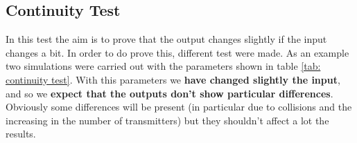 







\subsection{Continuity Test}
In this test the aim is to prove that the output changes slightly if the input changes a bit. In order to do prove this, different test were made. As an example  two simulations were carried out with the parameters shown in table \ref{tab: continuity test}. With this parameters we \textbf{have changed slightly the input}, and so we \textbf{expect that the outputs don't show particular differences}. Obviously some differences will be present (in particular due to collisions and the increasing in the number of transmitters) but they shouldn't affect a lot the results.

